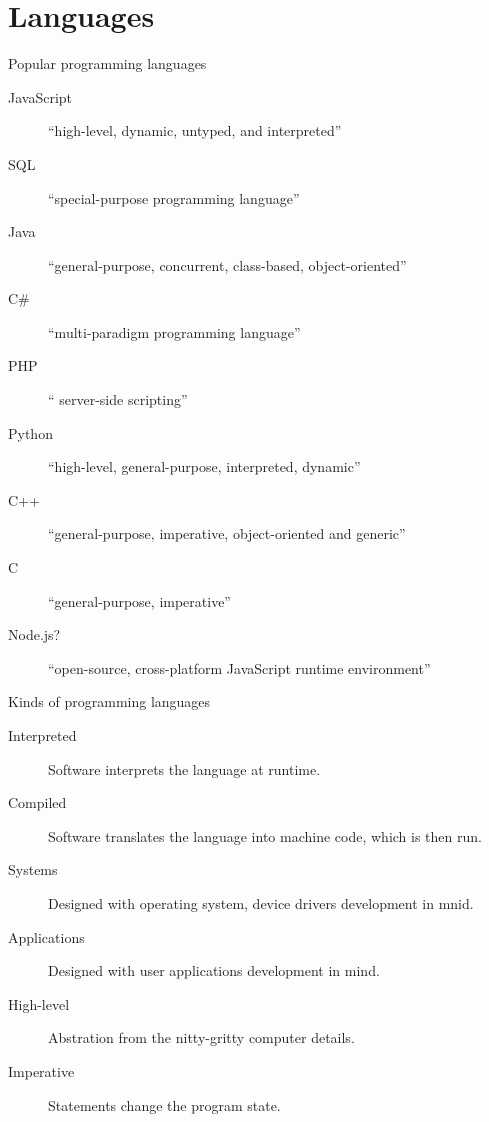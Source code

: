 
\section{Languages}

\begin{frame}{Popular programming languages}
  \begin{description}
    \item[JavaScript] ``high-level, dynamic, untyped, and interpreted''
    \item[SQL] ``special-purpose programming language''
    \item[Java] ``general-purpose, concurrent, class-based, object-oriented''
    \item[C\#] ``multi-paradigm programming language''
    \item[PHP] `` server-side scripting''
    \item[Python] ``high-level, general-purpose, interpreted, dynamic''
    \item[C++] ``general-purpose, imperative, object-oriented and generic''
    \item[C] ``general-purpose, imperative''
    \item[Node.js?] ``open-source, cross-platform JavaScript runtime environment''
  \end{description}
\end{frame}


\begin{frame}{Kinds of programming languages}
  \begin{description}
    \item[Interpreted] Software interprets the language at runtime. 
    \item[Compiled] Software translates the language into machine code, which is then run.\\[1cm] 
    \item[Systems] Designed with operating system, device drivers development in mnid.
    \item[Applications] Designed with user applications development in mind.\\[1cm]
    \item[High-level] Abstration from the nitty-gritty computer details.
    \item[Imperative] Statements change the program state.
  \end{description}
\end{frame}


